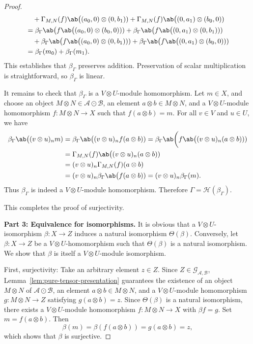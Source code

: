 \documentclass[12pt, english]{article}
\numberwithin{equation}{section}
\theoremstyle{plain}
\theoremstyle{definition}
\theoremstyle{remark}
\begin{document}
\begin{proof}
\begin{align*}
			& \quad +\Gamma_{M, N}(f) \ab\big((a_0, 0) \otimes (0, b_1)) +\Gamma_{M, N}(f) \ab\big((0, a_1) \otimes (b_0, 0)) \\
			& = \beta_{\Gamma} \ab\big(f \ab\big((a_0, 0) \otimes (b_0, 0)))
			+ \beta_{\Gamma} \ab\big(f \ab\big((0, a_1) \otimes (0, b_1))) \\
			& \quad +\beta_{\Gamma} \ab\big(f \ab\big((a_0, 0) \otimes (0, b_1))) + \beta_{\Gamma} \ab\big(f \ab\big((0, a_1) \otimes (b_0, 0))) \\
			& = \beta_{\Gamma}(m_0) +\beta_{\Gamma} (m_1).
		\end{align*}
		This establishes that $\beta_\Gamma$ preserves addition. Preservation of scalar multiplication is straightforward, so $\beta_\Gamma$ is linear.
		
		\vspace{0.2cm}
		
		It remains to check that $\beta_\Gamma$ is a $V\otimes U$-module homomorphism.
		Let $m \in X$,
		and choose an object $M \otimes N \in \mathcal{A} \odot \mathcal{B}$, an element $a \otimes b \in M \otimes N$, and a $V \otimes U$-module homomorphism
		$f \colon M \otimes N \to X$ such that $f(a \otimes b) = m$.
		For all $v \in V$ and $ u \in U$, we have
		\begin{align*}
			\beta_{\Gamma} \ab\big((v \otimes u)_n m) & = \beta_{\Gamma} \ab\big((v \otimes u)_n f(a \otimes b))
			= \beta_{\Gamma} \ab\bigg(f \ab\big((v \otimes u)_n (a \otimes b))) \\
			& = \Gamma_{M, N} (f) \ab\big((v \otimes u)_n (a \otimes b)) \\
			& = (v \otimes u)_n \Gamma_{M, N} (f) (a \otimes b) \\
			& = (v \otimes u)_n \beta_{\Gamma} \ab\big(f(a \otimes b)) = (v \otimes u)_n \beta_{\Gamma}(m).
		\end{align*}
		Thus $\beta_\Gamma$ is indeed a $V\otimes U$-module homomorphism.
		Therefore $\Gamma = \mathcal{H}(\beta_{\Gamma})$.
		
		This completes the proof of surjectivity.
		
		\smallskip
		\noindent\textbf{Part 3: Equivalence for isomorphisms.}
		It is obvious that a $V \otimes U$-isomorphism $\beta \colon X \to Z$ induces a natural isomorphism
		$\Theta(\beta)$.
		Conversely, let $ \beta \colon X \to Z $ be a $V \otimes U$-homomorphism such that $\Theta(\beta)$
		is a natural isomorphism. We show that $\beta$ is itself a $V\otimes U$-module isomorphism.
		
		First, surjectivity: Take an arbitrary element $z \in Z$.
		Since $Z \in \mathcal{G}_{\mathcal{A}, \mathcal{B}}$,
		Lemma~\ref{lem:pure-tensor-presentation} guarantees the existence of an object $M \otimes N$ of $\mathcal{A} \odot \mathcal{B}$,
		an element $a \otimes b \in M \otimes N$, and a $V \otimes U$-module homomorphism $g \colon M \otimes N \to Z$ satisfying $g(a \otimes b) = z$.
		Since $\Theta(\beta)$ is a natural isomorphism, there exists a $V \otimes U$-module homomorphism $f \colon M \otimes N \to X$ with $\beta f = g$.
		Set $m = f(a \otimes b)$. Then
		\[
		\beta(m) = \beta(f(a \otimes b)) = g(a \otimes b) = z,
		\]
		which shows that $\beta$ is surjective.
		

\end{proof}
\end{document}
